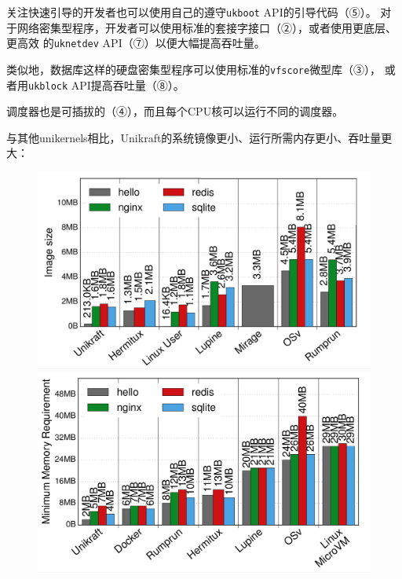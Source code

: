 \documentclass{../runikraft-report}
\begin{document}
关注快速引导的开发者也可以使用自己的遵守\texttt{ukboot} API的引导代码（⑤）。
对于网络密集型程序，开发者可以使用标准的套接字接口（②），或者使用更底层、更高效
的\texttt{uknetdev} API（⑦）以便大幅提高吞吐量。

类似地，数据库这样的硬盘密集型程序可以使用标准的\texttt{vfscore}微型库（③），
或者用\texttt{ukblock} API提高吞吐量（⑧）。

调度器也是可插拔的（④），而且每个CPU核可以运行不同的调度器。


与其他unikernels相比，Unikraft的系统镜像更小、运行所需内存更小、吞吐量更大：
\begin{figure}[H]
\centering
\begin{minipage}{0.32\linewidth}
\includegraphics[width=1\linewidth]{../assets/Unikraft-image-size.png}
\caption{}
\label{fig:unikraft-image-size}
\end{minipage}
\begin{minipage}{0.32\linewidth}
\includegraphics[width=1\linewidth]{../assets/Unikraft-memory.png}
\caption{}
\end{minipage}

\end{figure}
\end{document}
